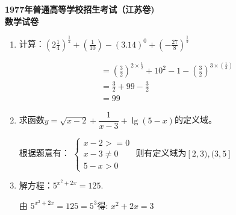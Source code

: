 \documentclass[answers]{exam}
\begin{document}
\begin{center}
	\textbf{1977年普通高等学校招生考试（江苏卷)}
	\\ \textbf{\Large{数学试卷}}
\end{center}

\begin{questions}
	\question
	\begin{enumerate}[label=(\arabic*)]
		\item 计算：$ \left(2\frac14\right)^\frac12 + \left(\frac{1}{10}\right) - (3.14)^0 +
			      \left(-\frac{27}{8}\right)^{\frac13} $
		      \begin{solution}
			      \begin{align*}
				       & = \left(\frac32\right)^{2\times\frac12} + 10^2 - 1 - \left(\frac32\right)^{3\times(\frac13)} \\
				       & = \frac32 + 99 - \frac32                                                                     \\
				       & = 99
			      \end{align*}
		      \end{solution}

		\item 求函数$y=\sqrt{x-2} + \dfrac{1}{x-3} + \lg(5-x)$的定义域。
		      \begin{solution}
			      根据题意有：
			      \begin{math}
				      \begin{cases}
					      x - 2 >= 0   \\
					      x - 3 \neq 0 \\
					      5 - x > 0
				      \end{cases}
			      \end{math}
			      则有定义域为$[2,3),(3,5]$

		      \end{solution}
		\item 解方程：$ 5^{x^2+2x} = 125 $.
		      \begin{solution}
			      由 $5^{x^2 + 2x} = 125 = 5^3 $得: $x^2 + 2x = 3$


\end{solution}
\end{enumerate}
\end{questions}
\end{document}
